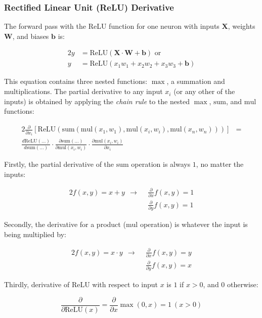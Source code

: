 \documentclass[a4paper]{article}
\newcommand{\matr}[1]{\mathbf{#1}}
\newcommand{\vect}[1]{\bm{#1}}
\newcommand{\mul}{\text{mul}}
\newcommand{\summ}{\text{sum}}
\newcommand{\relu}{\text{ReLU}}
\begin{document}
\subsubsection*{Rectified Linear Unit (ReLU) Derivative}

The forward pass with the ReLU function for one neuron with inputs $\matr{X}$, weights $\matr{W}$, and biases $\vect{b}$ is:

\begin{alignat*}{2}
    y &= \relu(\matr{X} \cdot \matr{W} + \vect{b}) \text{ or} \\
    y &= \relu(x_1w_1 + x_2w_2 + x_3w_3 + \vect{b})
\end{alignat*}

This equation contains three nested functions: $\max$, a summation and multiplications. The partial derivative to any input $x_i$ (or any other of the inputs) is obtained by applying the \emph{chain rule} to the nested $\max$, $\summ$, and $\mul$ functions:

\begin{alignat*}{2}
    \frac{\partial}{\partial x_i}[\relu(\summ(\mul(x_1,w_1),\mul(x_i,w_i),\mul(x_n,w_n)))] &=\\
    \frac{d\relu(\dots)}{d\summ(\dots)} \cdot \frac{\partial\summ(\dots)}{\partial\mul(x_i,w_i)} \cdot \frac{\partial\mul(x_i,w_i)}{\partial x_i} &
\end{alignat*}

Firstly, the partial derivative of the $\summ$ operation is always $1$, no matter the inputs:

\begin{alignat*}{2}
    f(x,y) = x+y ~~ \rightarrow ~~ &\frac{\partial}{\partial x}f(x,y) = 1 \\
                                   &\frac{\partial}{\partial y}f(x,y) = 1
\end{alignat*}

Secondly, the derivative for a product ($\mul$ operation) is whatever the input is being multiplied by:

\begin{alignat*}{2}
    f(x,y) = x \cdot y ~~ \rightarrow ~~ &\frac{\partial}{\partial x}f(x,y) = y \\
                                         &\frac{\partial}{\partial y}f(x,y) = x
\end{alignat*}

Thirdly, derivative of $\relu$ with respect to input $x$ is $1$ if $x > 0$, and $0$ otherwise:

\begin{equation*}{}
    \frac{\partial}{\partial\relu(x)} = \frac{\partial}{\partial x}\max(0, x) = 1 \: (x > 0)
\end{equation*}
\end{document}
